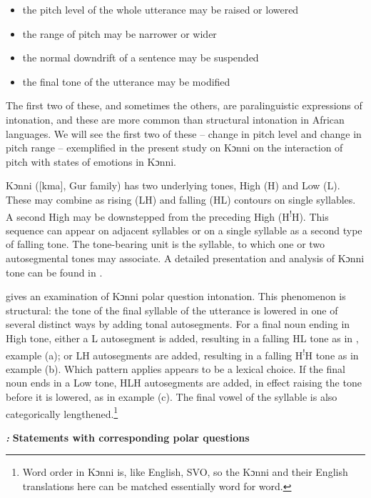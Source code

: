 \documentclass[output=paper]{langsci/langscibook}
\begin{document}
\begin{itemize}
\item the pitch level of the whole utterance may be raised or lowered
\item the range of pitch may be narrower or wider
\item the normal downdrift of a sentence may be suspended
\item the final tone of the utterance may be modified
\end{itemize}

The first two of these, and sometimes the others, are paralinguistic expressions of intonation, and these are more common than structural intonation in African languages. We will see the first two of these – change in pitch level and change in pitch range – exemplified in the present study on Kɔnni on the interaction of pitch with states of emotions in Kɔnni.

Kɔnni ([kma], Gur family) has two underlying tones, High (H) and Low (L). These may combine as rising (LH) and falling (HL) contours on single syllables. A second High may be downstepped from the preceding High (H\textsuperscript{!}H). This sequence can appear on adjacent syllables or on a single syllable as a second type of falling tone. The tone-bearing unit is the syllable, to which one or two autosegmental tones may associate. A detailed presentation and analysis of Kɔnni tone can be found in \citet{Cahill2007}. 

\citet{Cahill2012} gives an examination of Kɔnni polar question intonation. This phenomenon is structural: the tone of the final syllable of the utterance is lowered in one of several distinct ways by adding tonal autosegments. For a final noun ending in High tone, either a L autosegment is added, resulting in a falling HL tone as in , example (a); or LH autosegments are added, resulting in a falling H\textsuperscript{!}H tone as in example (b). Which pattern applies appears to be a lexical choice. If the final noun ends in a Low tone, HLH autosegments are added, in effect raising the tone before it is lowered, as in example (c). The final vowel of the syllable is also categorically lengthened.\footnote{ Word order in Kɔnni is, like English, SVO, so the Kɔnni and their English translations here can be matched essentially word for word.}

\emph{\textbf{\textup{:}}}\textbf{ }\textbf{Statements with corresponding polar questions}
\end{document}

